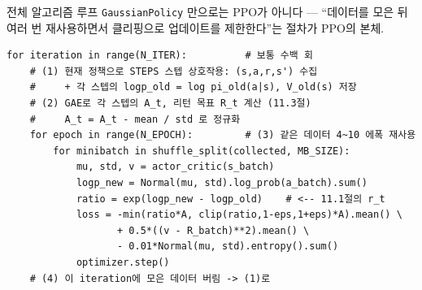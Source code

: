 \begin{frame}[fragile]{전체 알고리즘 루프}
  \texttt{GaussianPolicy} 만으로는 PPO가 아니다 —
  ``데이터를 모은 뒤 여러 번 재사용하면서 클리핑으로 업데이트를
  제한한다''는 절차가 PPO의 본체.
  \begin{lstlisting}
for iteration in range(N_ITER):          # 보통 수백 회
    # (1) 현재 정책으로 STEPS 스텝 상호작용: (s,a,r,s') 수집
    #     + 각 스텝의 logp_old = log pi_old(a|s), V_old(s) 저장
    # (2) GAE로 각 스텝의 A_t, 리턴 목표 R_t 계산 (11.3절)
    #     A_t = A_t - mean / std 로 정규화
    for epoch in range(N_EPOCH):         # (3) 같은 데이터 4~10 에폭 재사용
        for minibatch in shuffle_split(collected, MB_SIZE):
            mu, std, v = actor_critic(s_batch)
            logp_new = Normal(mu, std).log_prob(a_batch).sum()
            ratio = exp(logp_new - logp_old)    # <-- 11.1절의 r_t
            loss = -min(ratio*A, clip(ratio,1-eps,1+eps)*A).mean() \
                   + 0.5*((v - R_batch)**2).mean() \
                   - 0.01*Normal(mu, std).entropy().sum()
            optimizer.step()
    # (4) 이 iteration에 모은 데이터 버림 -> (1)로
  \end{lstlisting}
\end{frame}
